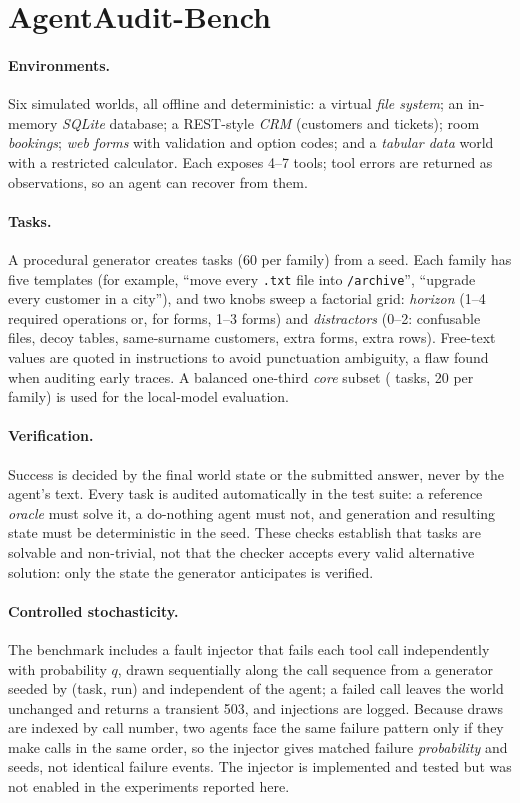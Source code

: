 \section{AgentAudit-Bench}\label{sec:bench}
\paragraph{Environments.} Six simulated worlds, all offline and deterministic: a virtual \emph{file system}; an in-memory \emph{SQLite} database; a REST-style \emph{CRM} (customers and tickets); room \emph{bookings}; \emph{web forms} with validation and option codes; and a \emph{tabular data} world with a restricted calculator. Each exposes 4--7 tools; tool errors are returned as observations, so an agent can recover from them.

\paragraph{Tasks.} A procedural generator creates \Ntasks{} tasks (60 per family) from a seed. Each family has five templates (for example, ``move every \texttt{.txt} file into \texttt{/archive}'', ``upgrade every customer in a city''), and two knobs sweep a factorial grid: \emph{horizon} (1--4 required operations or, for forms, 1--3 forms) and \emph{distractors} (0--2: confusable files, decoy tables, same-surname customers, extra forms, extra rows). Free-text values are quoted in instructions to avoid punctuation ambiguity, a flaw found when auditing early traces. A balanced one-third \emph{core} subset (\Ncore{} tasks, 20 per family) is used for the local-model evaluation.

\paragraph{Verification.} Success is decided by the final world state or the submitted answer, never by the agent's text. Every task is audited automatically in the test suite: a reference \emph{oracle} must solve it, a do-nothing agent must not, and generation and resulting state must be deterministic in the seed. These checks establish that tasks are solvable and non-trivial, not that the checker accepts every valid alternative solution: only the state the generator anticipates is verified.

\paragraph{Controlled stochasticity.} The benchmark includes a fault injector that fails each tool call independently with probability $q$, drawn sequentially along the call sequence from a generator seeded by (task, run) and independent of the agent; a failed call leaves the world unchanged and returns a transient 503, and injections are logged. Because draws are indexed by call number, two agents face the same failure pattern only if they make calls in the same order, so the injector gives matched failure \emph{probability} and seeds, not identical failure events. The injector is implemented and tested but was not enabled in the experiments reported here.

